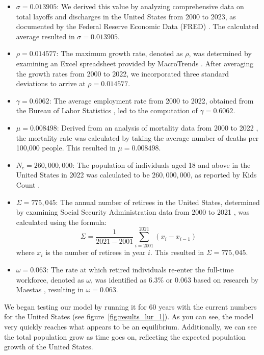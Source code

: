 \documentclass[11pt]{amsart}
\begin{document}
\begin{itemize}
    \item $\sigma = 0.013905$: We derived this value by analyzing comprehensive data on total layoffs and discharges in the United States from 2000 to 2023, as documented by the Federal Reserve Economic Data (FRED) \cite{FRED}. The calculated average resulted in $\sigma = 0.013905$.
    \item $\rho = 0.014577$: The maximum growth rate, denoted as $\rho$, was determined by examining an Excel spreadsheet provided by MacroTrends \cite{MacroTrends}. After averaging the growth rates from 2000 to 2022, we incorporated three standard deviations to arrive at $\rho = 0.014577$.
    \item $\gamma = 0.6062$: The average employment rate from 2000 to 2022, obtained from the Bureau of Labor Statistics \cite{BLS}, led to the computation of $\gamma = 0.6062$.
    \item $\mu = 0.008498$: Derived from an analysis of mortality data from 2000 to 2022 \cite{usafacts}, the mortality rate was calculated by taking the average number of deaths per 100,000 people. This resulted in $\mu = 0.008498$.
    \item $N_c = 260,000,000$: The population of individuals aged 18 and above in the United States in 2022 was calculated to be $260,000,000$, as reported by Kids Count \cite{kidscount}.
    \item $\Sigma = 775,045$: The annual number of retirees in the United States, determined by examining Social Security Administration data from 2000 to 2021 \cite{ssa}, was calculated using the formula:
    \[
        \Sigma = \frac{1}{2021 - 2001}\sum_{i=2001}^{2021}(x_i - x_{i-1})
    \]
    where $x_i$ is the number of retirees in year $i$. This resulted in $\Sigma = 775,045$.
    \item $\omega = 0.063$: The rate at which retired individuals re-enter the full-time workforce, denoted as $\omega$, was identified as 6.3\% or $0.063$ based on research by Maestas \cite{maestas}, resulting in $\omega = 0.063$.
\end{itemize}

We began testing our model by running it for 60 years with the current numbers for the United States (see figure~\ref{fig:results_lur_1}). As you can see,
the model very quickly reaches what appears to be an equilibrium. Additionally, we can see the total population grow as time goes on, reflecting the expected population growth of the United States.
\end{document}
